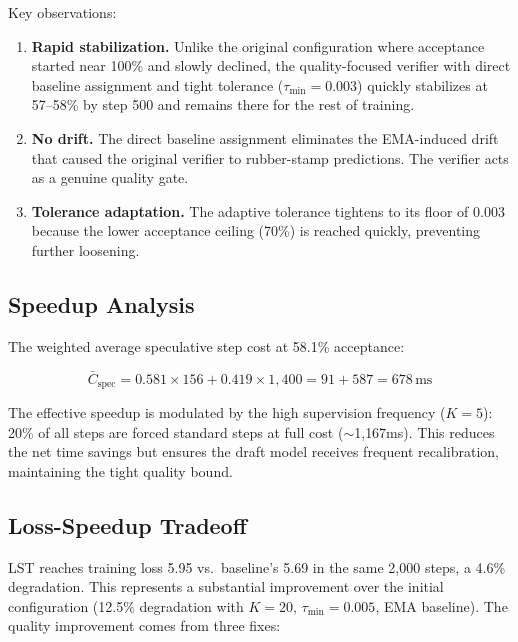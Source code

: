 \documentclass[conference]{IEEEtran}
\begin{document}
Key observations:

\begin{enumerate}
    \item \textbf{Rapid stabilization.} Unlike the original configuration where acceptance started near 100\% and slowly declined, the quality-focused verifier with direct baseline assignment and tight tolerance ($\tau_{\min}{=}0.003$) quickly stabilizes at 57--58\% by step 500 and remains there for the rest of training.
    
    \item \textbf{No drift.} The direct baseline assignment eliminates the EMA-induced drift that caused the original verifier to rubber-stamp predictions. The verifier acts as a genuine quality gate.
    
    \item \textbf{Tolerance adaptation.} The adaptive tolerance tightens to its floor of 0.003 because the lower acceptance ceiling (70\%) is reached quickly, preventing further loosening.
\end{enumerate}

\subsection{Speedup Analysis}

The weighted average speculative step cost at 58.1\% acceptance:

\begin{equation}
\bar{C}_{\mathrm{spec}} = 0.581 \times 156 + 0.419 \times 1{,}400 = 91 + 587 = 678\,\text{ms}
\end{equation}

The effective speedup is modulated by the high supervision frequency ($K{=}5$): 20\% of all steps are forced standard steps at full cost ($\sim$1{,}167ms). This reduces the net time savings but ensures the draft model receives frequent recalibration, maintaining the tight quality bound.

\subsection{Loss-Speedup Tradeoff}

LST reaches training loss 5.95 vs.\ baseline's 5.69 in the same 2,000 steps, a 4.6\% degradation. This represents a substantial improvement over the initial configuration (12.5\% degradation with $K{=}20$, $\tau_{\min}{=}0.005$, EMA baseline). The quality improvement comes from three fixes:
\end{document}
